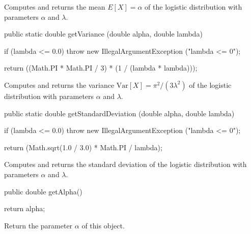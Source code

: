 \begin{tabb}  Computes and returns the mean $E[X] = \alpha$ of the logistic distribution
   with parameters $\alpha$ and $\lambda$.
\end{tabb}
\begin{htmlonly}
\end{htmlonly}
\begin{code}

   public static double getVariance (double alpha, double lambda)\begin{hide} {
      if (lambda <= 0.0)
         throw new IllegalArgumentException ("lambda <= 0");

      return ((Math.PI * Math.PI / 3) * (1 / (lambda * lambda)));
   }\end{hide}
\end{code}
\begin{tabb}  Computes and returns the variance $\mbox{Var}[X] =
   \pi^2 /(3\lambda^2)$ of the logistic distribution
   with parameters $\alpha$ and $\lambda$.
\end{tabb}
\begin{htmlonly}
   \return{the variance of the logistic distribution
    $\mbox{Var}[X] = 1 / 3 \pi^2 * (1 / \lambda^2)$
\end{htmlonly}
\begin{code}

   public static double getStandardDeviation (double alpha, double lambda)\begin{hide} {
      if (lambda <= 0.0)
         throw new IllegalArgumentException ("lambda <= 0");

      return (Math.sqrt(1.0 / 3.0) * Math.PI / lambda);
   }\end{hide}
\end{code}
\begin{tabb}  Computes and returns the standard deviation of the logistic distribution
   with parameters $\alpha$ and $\lambda$.
\end{tabb}
\begin{htmlonly}
\end{htmlonly}
\begin{code}

   public double getAlpha()\begin{hide} {
      return alpha;
   }\end{hide}
\end{code}
  \begin{tabb} Return the parameter $\alpha$ of this object.
  \end{tabb}
